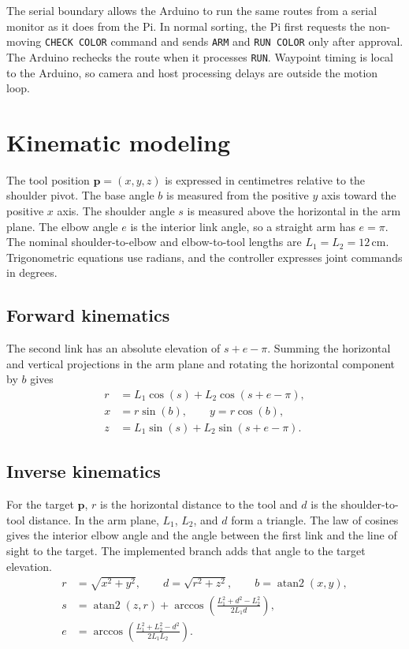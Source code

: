 \documentclass[11pt,a4paper]{article}
\begin{document}
The serial boundary allows the Arduino to run the same routes from a serial monitor as it does from the Pi. In normal sorting, the Pi first requests the non-moving \texttt{CHECK COLOR} command and sends \texttt{ARM} and \texttt{RUN COLOR} only after approval. The Arduino rechecks the route when it processes \texttt{RUN}. Waypoint timing is local to the Arduino, so camera and host processing delays are outside the motion loop.

\clearpage
\section{Kinematic modeling}
The tool position $\mathbf p=(x,y,z)$ is expressed in centimetres relative to the shoulder pivot. The base angle $b$ is measured from the positive $y$ axis toward the positive $x$ axis. The shoulder angle $s$ is measured above the horizontal in the arm plane. The elbow angle $e$ is the interior link angle, so a straight arm has $e=\pi$. The nominal shoulder-to-elbow and elbow-to-tool lengths are $L_1=L_2=12\,\mathrm{cm}$. Trigonometric equations use radians, and the controller expresses joint commands in degrees.

\subsection{Forward kinematics}
The second link has an absolute elevation of $s+e-\pi$. Summing the horizontal and vertical projections in the arm plane and rotating the horizontal component by $b$ gives
\begin{equation}\label{eq:fk}
\begin{aligned}
r &= L_1\cos(s)+L_2\cos(s+e-\pi),\\
x &= r\sin(b), \qquad y=r\cos(b),\\
z &= L_1\sin(s)+L_2\sin(s+e-\pi).
\end{aligned}
\end{equation}

\subsection{Inverse kinematics}
For the target $\mathbf p$, $r$ is the horizontal distance to the tool and $d$ is the shoulder-to-tool distance. In the arm plane, $L_1$, $L_2$, and $d$ form a triangle. The law of cosines gives the interior elbow angle and the angle between the first link and the line of sight to the target. The implemented branch adds that angle to the target elevation.
\begin{equation}\label{eq:ik}
\begin{aligned}
r &= \sqrt{x^2+y^2}, \qquad d=\sqrt{r^2+z^2}, \qquad b=\operatorname{atan2}(x,y),\\
s &= \operatorname{atan2}(z,r)+
  \arccos\left(\frac{L_1^2+d^2-L_2^2}{2L_1d}\right),\\
e &= \arccos\left(\frac{L_1^2+L_2^2-d^2}{2L_1L_2}\right).
\end{aligned}
\end{equation}
\end{document}
